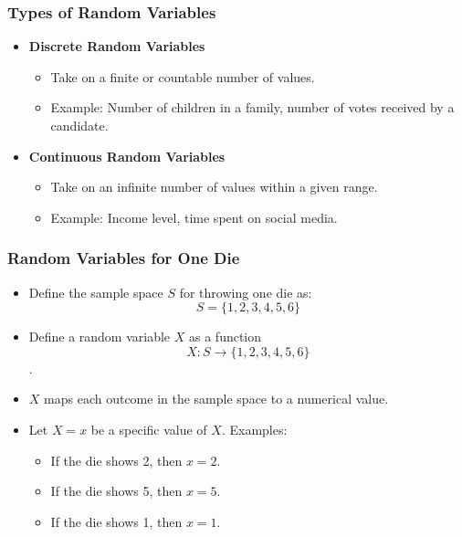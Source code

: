 \documentclass[handout]{beamer} %
\begin{document}
\begin{frame}
    \frametitle{Types of Random Variables}
    \begin{itemize}
        \item \textbf{Discrete Random Variables} \pause
        \begin{itemize}
            \item Take on a finite or countable number of values. \pause
            \item Example: Number of children in a family, number of votes received by a candidate. \pause
        \end{itemize}
        \item \textbf{Continuous Random Variables} \pause
        \begin{itemize}
            \item Take on an infinite number of values within a given range. \pause
            \item Example: Income level, time spent on social media. \pause
        \end{itemize}
    \end{itemize}
\end{frame}

\begin{frame}
    \frametitle{Random Variables for One Die}
    \begin{itemize}
        \item Define the sample space \( S \) for throwing one die as: \pause
        \[
        S = \{1, 2, 3, 4, 5, 6\}
        \]  \pause \vspace{-1.5em}
        \item Define a random variable \( X \) as a function
            \[ X: S \rightarrow \{1, 2, 3, 4, 5, 6\} \]. \pause \vspace{-1.5em}
        \item \( X \) maps each outcome in the sample space to a numerical value. \pause
        \item Let $X=x$ be a specific value of $X$. Examples: \pause
        \begin{itemize}
            \item If the die shows 2, then \( x = 2 \). \pause
            \item If the die shows 5, then \( x = 5 \). \pause
            \item If the die shows 1, then \( x = 1 \). \pause
        \end{itemize}
    \end{itemize}
\end{frame}
\end{document}
